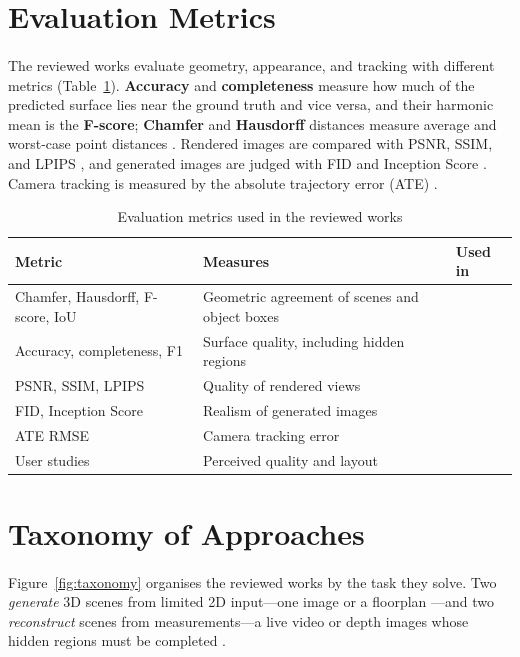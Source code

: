 \documentclass[12pt,a4paper,final]{extreport}
\begin{document}
\section{Evaluation Metrics}

\paragraph{} The reviewed works evaluate geometry, appearance, and tracking with different metrics (Table~\ref{tab:metrics}). \textbf{Accuracy} and \textbf{completeness} measure how much of the predicted surface lies near the ground truth and vice versa, and their harmonic mean is the \textbf{F-score}; \textbf{Chamfer} and \textbf{Hausdorff} distances measure average and worst-case point distances \cite{p1,p4}. Rendered images are compared with PSNR, SSIM, and LPIPS \cite{p3}, and generated images are judged with FID and Inception Score \cite{p2}. Camera tracking is measured by the absolute trajectory error (ATE) \cite{p3}.

{\renewcommand{\arraystretch}{1.15}
\begin{table}[htbp]
\centering
\caption{Evaluation metrics used in the reviewed works}\label{tab:metrics}
\small
\begin{tabularx}{\textwidth}{|>{\raggedright\arraybackslash}p{3.4cm}|X|p{1.6cm}|}
\hline
\textbf{Metric} & \textbf{Measures} & \textbf{Used in} \\ \hline
Chamfer, Hausdorff, F-score, IoU & Geometric agreement of scenes and object boxes & \cite{p1} \\ \hline
Accuracy, completeness, F1 & Surface quality, including hidden regions & \cite{p4} \\ \hline
PSNR, SSIM, LPIPS & Quality of rendered views & \cite{p1,p2,p3} \\ \hline
FID, Inception Score & Realism of generated images & \cite{p2} \\ \hline
ATE RMSE & Camera tracking error & \cite{p3} \\ \hline
User studies & Perceived quality and layout & \cite{p1,p2} \\ \hline
\end{tabularx}
\end{table}}

\section{Taxonomy of Approaches}

\paragraph{} Figure~\ref{fig:taxonomy} organises the reviewed works by the task they solve. Two \emph{generate} 3D scenes from limited 2D input---one image \cite{p1} or a floorplan \cite{p2}---and two \emph{reconstruct} scenes from measurements---a live video \cite{p3} or depth images whose hidden regions must be completed \cite{p4}.
\end{document}

